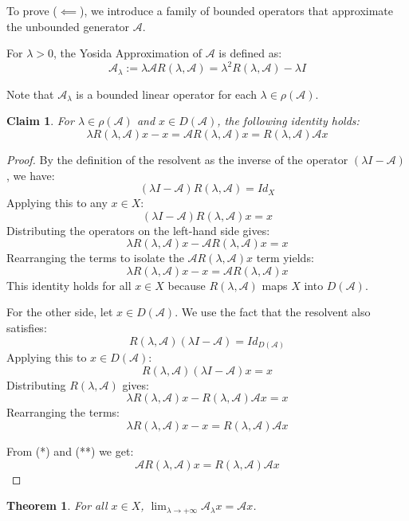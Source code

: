 \documentclass[12pt, oneside]{book}
\newtheorem{theo}{Theorem}[section]
\newtheorem{claim}{Claim}[section]
\newcommand{\A}{\mathscr{A}}
\begin{document}
To prove ($\impliedby$), we introduce a family of bounded operators that approximate the unbounded generator $\A$.

\begin{definition}
\label{hy:yoshida_approx} For $\lambda > 0$, the Yosida Approximation of $\A$ is defined as:
$$
        \A_\lambda := \lambda \A R(\lambda, \A) = \lambda^2 R(\lambda, \A) - \lambda I
$$
\end{definition}
Note that $\A_\lambda$ is a bounded linear operator for each $\lambda \in \rho(\A)$.

\begin{claim}
For $\lambda \in \rho(\A)$ and $x \in D(\A)$, the following identity holds:
$$
    \lambda R(\lambda, \A)x - x = \A R(\lambda, \A)x = R(\lambda, \A)\A x
$$
\end{claim}

\begin{proof}
By the definition of the resolvent as the inverse of the operator $(\lambda I - \A)$, we have:
$$
(\lambda I - \A) R(\lambda, \A) = Id_{X}
$$
Applying this to any $x \in X$:
$$
    (\lambda I - \A) R(\lambda, \A)x = x
$$
Distributing the operators on the left-hand side gives:
$$
    \lambda R(\lambda, \A)x - \A R(\lambda, \A)x = x
$$
Rearranging the terms to isolate the $\A R(\lambda, \A)x$ term yields:
\begin{equation*}
\lambda R(\lambda, \A)x - x = \A R(\lambda, \A)x \tag{*}
\end{equation*}
This identity holds for all $x \in X$ because $R(\lambda, \A)$ maps $X$ into $D(\A)$.

For the other side, let $x \in D(\A)$. We use the fact that the resolvent also satisfies:
$$
	R(\lambda, \A) (\lambda I - \A) = Id_{D(\A)}
$$
Applying this to $x \in D(\A)$:
$$
    R(\lambda, \A) (\lambda I - \A)x = x
$$
Distributing $R(\lambda, \A)$ gives:
$$
    \lambda R(\lambda, \A)x - R(\lambda, \A)\A x = x
$$
Rearranging the terms:
\begin{equation*}
    \lambda R(\lambda, \A)x - x = R(\lambda, \A)\A x \tag{**}
\end{equation*}

From (*) and (**) we get:
$$
    \A R(\lambda, \A)x = R(\lambda, \A)\A x
$$
\end{proof}

\begin{theo}
\label{hy:yosida_conv} For all $x \in X$, $\displaystyle \lim_{\lambda \to +\infty} \A_\lambda x = \A x$.
\end{theo}
\end{document}

